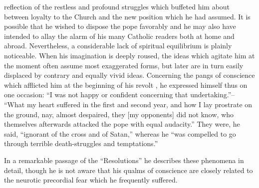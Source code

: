 reflection of the restless and profound struggles which buffeted him
about between loyalty to the Church and the new position which
he had assumed. It is possible that he wished to dispose the pope
favorably and he may also have intended to allay the alarm of his
many Catholic readers both at home and abroad. Nevertheless, a considerable
lack of spiritual equilibrium is plainly noticeable. When
his imagination is deeply roused, the ideas which agitate him at the
moment often assume most exaggerated forms, but later are in turn
easily displaced by contrary and equally vivid ideas. Concerning the
pangs of conscience which afflicted him at the beginning of his revolt
, he expressed himself thus on one occasion: “I was not happy
or confident concerning that undertaking.”-- “What my heart suffered
in the first and second year, and how I lay prostrate on the
ground, nay, almost despaired, they [my opponents] did not know,
who themselves afterwards attacked the pope with equal audacity.”
They were, he said, “ignorant of the cross and of Satan,” whereas
he “was compelled to go through terrible death-struggles and
temptations.”

In a remarkable passage of the “Resolutions” he describes these
phenomena in detail, though he is not aware that his qualms of conscience
are closely related to the neurotic precordial fear which he
frequently suffered.

